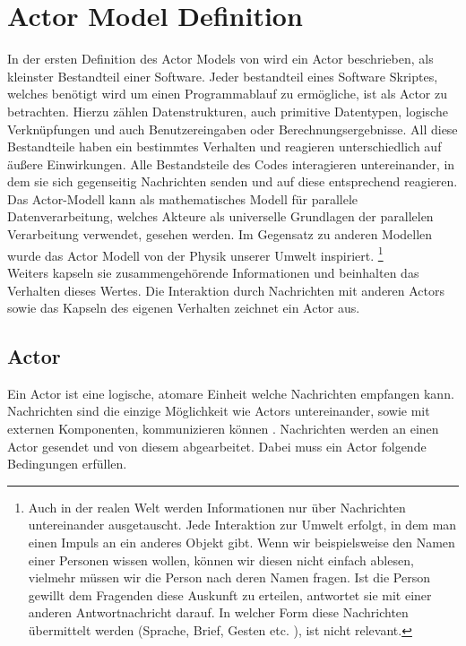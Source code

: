 \section{Actor Model Definition}
In der ersten Definition des Actor Models von \citep{hewitt1973session} wird ein Actor beschrieben, als kleinster Bestandteil einer Software. Jeder bestandteil eines Software Skriptes, welches benötigt wird um einen Programmablauf zu ermögliche, ist als Actor zu betrachten. Hierzu zählen Datenstrukturen, auch primitive Datentypen, logische Verknüpfungen und auch Benutzereingaben oder Berechnungsergebnisse. All diese Bestandteile haben ein bestimmtes Verhalten und reagieren unterschiedlich auf äußere Einwirkungen. Alle Bestandsteile des Codes interagieren untereinander, in dem sie sich gegenseitig Nachrichten senden und auf diese entsprechend reagieren.\\
Das Actor-Modell kann als mathematisches Modell für parallele Datenverarbeitung, welches Akteure als universelle Grundlagen der parallelen Verarbeitung verwendet, gesehen werden. Im Gegensatz zu anderen Modellen wurde das Actor Modell von der Physik unserer Umwelt inspiriert. \footnote{Auch in der realen Welt werden Informationen nur über Nachrichten untereinander ausgetauscht. Jede Interaktion zur Umwelt erfolgt, in dem man einen Impuls an ein anderes Objekt gibt. Wenn wir beispielsweise den Namen einer Personen wissen wollen, können wir diesen nicht einfach ablesen, vielmehr müssen wir die Person nach deren Namen fragen. Ist die Person gewillt dem Fragenden diese Auskunft zu erteilen, antwortet sie mit einer anderen Antwortnachricht darauf. In welcher Form diese Nachrichten übermittelt werden (Sprache, Brief, Gesten etc. ), ist nicht relevant.} \citep{Vernon2015ReactiveAkka} \\ 
Weiters kapseln sie zusammengehörende Informationen und beinhalten das Verhalten dieses Wertes. Die Interaktion durch Nachrichten mit anderen Actors sowie das Kapseln des eigenen Verhalten zeichnet ein Actor aus.

\subsection{Actor}
Ein Actor ist eine logische, atomare Einheit welche Nachrichten empfangen kann. Nachrichten sind die einzige Möglichkeit wie Actors untereinander, sowie mit externen Komponenten, kommunizieren können \citep{Agha1985ConcurrentParallelism}. Nachrichten werden an einen Actor gesendet und von diesem abgearbeitet. Dabei muss ein Actor folgende Bedingungen erfüllen.

